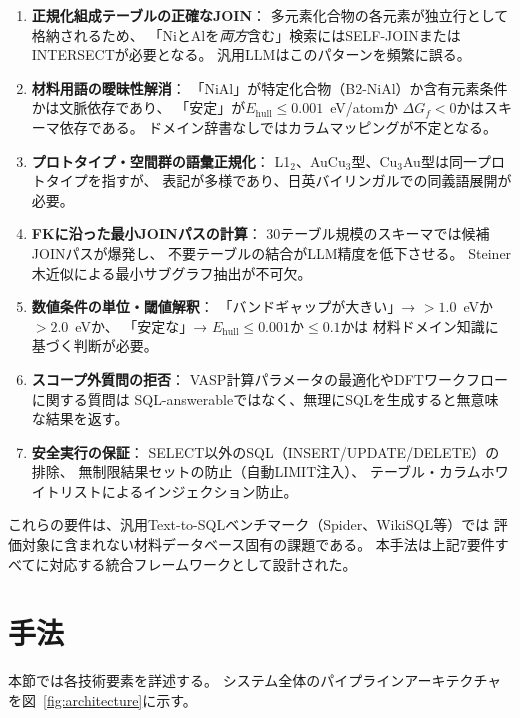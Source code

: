 \documentclass[5p,twocolumn]{elsarticle}
\begin{document}
\begin{enumerate}
  \item \textbf{正規化組成テーブルの正確なJOIN}：
    多元素化合物の各元素が独立行として格納されるため、
    「NiとAlを\emph{両方}含む」検索にはSELF-JOINまたはINTERSECTが必要となる。
    汎用LLMはこのパターンを頻繁に誤る。
  \item \textbf{材料用語の曖昧性解消}：
    「NiAl」が特定化合物（B2-NiAl）か含有元素条件かは文脈依存であり、
    「安定」が$E_\mathrm{hull} \leq 0.001$~eV/atomか
    $\Delta G_f < 0$かはスキーマ依存である。
    ドメイン辞書なしではカラムマッピングが不定となる。
  \item \textbf{プロトタイプ・空間群の語彙正規化}：
    L1$_2$、AuCu$_3$型、Cu$_3$Au型は同一プロトタイプを指すが、
    表記が多様であり、日英バイリンガルでの同義語展開が必要。
  \item \textbf{FKに沿った最小JOINパスの計算}：
    30テーブル規模のスキーマでは候補JOINパスが爆発し、
    不要テーブルの結合がLLM精度を低下させる。
    Steiner木近似による最小サブグラフ抽出が不可欠。
  \item \textbf{数値条件の単位・閾値解釈}：
    「バンドギャップが大きい」→ $> 1.0$~eVか$> 2.0$~eVか、
    「安定な」→ $E_\mathrm{hull} \leq 0.001$か$\leq 0.1$かは
    材料ドメイン知識に基づく判断が必要。
  \item \textbf{スコープ外質問の拒否}：
    VASP計算パラメータの最適化やDFTワークフローに関する質問は
    SQL-answerableではなく、無理にSQLを生成すると無意味な結果を返す。
  \item \textbf{安全実行の保証}：
    SELECT以外のSQL（INSERT/UPDATE/DELETE）の排除、
    無制限結果セットの防止（自動LIMIT注入）、
    テーブル・カラムホワイトリストによるインジェクション防止。
\end{enumerate}

これらの要件は、汎用Text-to-SQLベンチマーク（Spider、WikiSQL等）では
評価対象に含まれない材料データベース固有の課題である。
本手法は上記7要件すべてに対応する統合フレームワークとして設計された。

\section{手法}
\label{sec:methods}

本節では各技術要素を詳述する。
システム全体のパイプラインアーキテクチャを図~\ref{fig:architecture}に示す。
\end{document}
